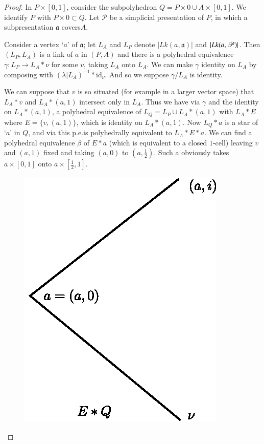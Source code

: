 \begin{proof}
In $P\times[0,1]$, consider the subpolyhedron $Q=P\times 0\cup A\times[0,1]$. We identify $P$ with $P\times 0\subset Q$. Let $\mathscr{P}$ be a simplicial presentation of $P$, in which a subpresentation $\mathfrak{a}$ covers\pageoriginale $A$.

Consider a vertex `$a$' of $\mathfrak{a}$; let $L_{A}$ and $L_{P}$ denote $|Lk(a,\mathfrak{a})|$ and $|Lk(a,\break\mathscr{P})|$. Then $(L_{P},L_{A})$ is a link of $a$ in $(P,A)$ and there is a polyhedral equivalence $\gamma:L_{P}\to L_{A}\ast\nu$ for some $v$, taking $L_{A}$ onto $L_{A}$. We can make $\gamma$ identity on $L_{A}$ by composing with $(\lambda|L_{A})^{-1}\ast \text{id}_{\nu}$. And so we suppose $\gamma/L_{A}$ is identity.

We can suppose that $v$ is so situated (for example in a larger vector space) that $L_{A}\ast v$ and $L_{A}\ast(a,1)$ intersect only in $L_{A}$. Thus we have via $\gamma$ and the identity on $L_{A}\ast(a,1)$, a polyhedral equivalence of $L_{Q}=L_{P}\cup L_{A}\ast(a,1)$ with $L_{A}\ast E$ where $E=\{v,(a,1)\}$, which is identity on $L_{A}\ast(a,1)$. Now $L_{Q}\ast a$ is a star of `$a$' in $Q$, and via this p.e.\@ is polyhedrally equivalent to $L_{A}\ast E\ast a$.
We can find a polyhedral equivalence $\beta$ of $E\ast a$ (which is equivalent to a closed $1$-cell) leaving $v$ and $(a,1)$ fixed and taking $(a,0)$ to $(a,\frac{1}{2})$. Such a obviously takes $a\times [0,1]$ onto $a\times [\frac{1}{2},1]$.

\begin{figure}
\centering
\includegraphics{figure/fig13.eps}
\end{figure}


\end{proof}
